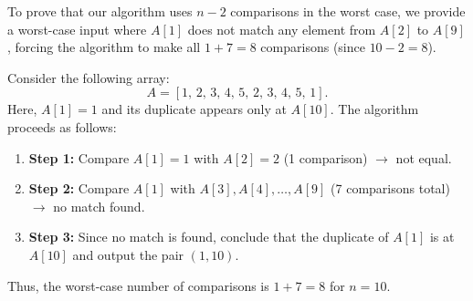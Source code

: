 \documentclass[11pt]{article}
\begin{document}
    To prove that our algorithm uses \( n-2 \) comparisons in the worst case, we provide a worst-case input where \( A[1] \) does not match any element from \( A[2] \) to \( A[9] \), forcing the algorithm to make all \( 1 + 7 = 8 \) comparisons (since \( 10-2 = 8 \)).
    
    Consider the following array:
    \[
    A = [1,\, 2,\, 3,\, 4,\, 5,\, 2,\, 3,\, 4,\, 5,\, 1].
    \]
    Here, \( A[1] = 1 \) and its duplicate appears only at \( A[10] \). The algorithm proceeds as follows:
    \begin{enumerate}
        \item \textbf{Step 1:} Compare \( A[1] = 1 \) with \( A[2] = 2 \) (1 comparison) \(\rightarrow\) not equal.
        \item \textbf{Step 2:} Compare \( A[1] \) with \( A[3], A[4], \dots, A[9] \) (7 comparisons total) \(\rightarrow\) no match found.
        \item \textbf{Step 3:} Since no match is found, conclude that the duplicate of \( A[1] \) is at \( A[10] \) and output the pair \((1,10)\).
    \end{enumerate}
    
    Thus, the worst-case number of comparisons is \( 1 + 7 = 8 \) for \( n = 10 \).
    
\end{document}
